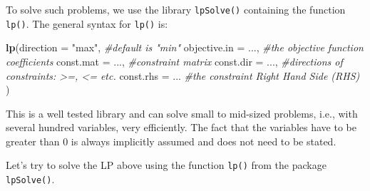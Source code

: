 \documentclass[11pt,]{article}
\newenvironment{Shaded}{\begin{snugshade}}{\end{snugshade}}
\newcommand{\KeywordTok}[1]{\textcolor[rgb]{0.13,0.29,0.53}{\textbf{#1}}}
\newcommand{\DataTypeTok}[1]{\textcolor[rgb]{0.13,0.29,0.53}{#1}}
\newcommand{\DecValTok}[1]{\textcolor[rgb]{0.00,0.00,0.81}{#1}}
\newcommand{\FloatTok}[1]{\textcolor[rgb]{0.00,0.00,0.81}{#1}}
\newcommand{\StringTok}[1]{\textcolor[rgb]{0.31,0.60,0.02}{#1}}
\newcommand{\CommentTok}[1]{\textcolor[rgb]{0.56,0.35,0.01}{\textit{#1}}}
\newcommand{\OperatorTok}[1]{\textcolor[rgb]{0.81,0.36,0.00}{\textbf{#1}}}
\newcommand{\NormalTok}[1]{#1}
\begin{document}
To solve such problems, we use the library \texttt{lpSolve()} containing
the function \texttt{lp()}. The general syntax for \texttt{lp()} is:

\begin{Shaded}
\begin{Highlighting}[]
\KeywordTok{lp}\NormalTok{(}\DataTypeTok{direction =} \StringTok{"max"}\NormalTok{, }\CommentTok{#default is "min"}
   \DataTypeTok{objective.in =}\NormalTok{ ..., }\CommentTok{#the objective function coefficients}
   \DataTypeTok{const.mat =}\NormalTok{ ..., }\CommentTok{#constraint matrix }
   \DataTypeTok{const.dir =}\NormalTok{ ..., }\CommentTok{#directions of constraints: >=, <= etc.}
   \DataTypeTok{const.rhs =}\NormalTok{ ...  }\CommentTok{#the constraint Right Hand Side (RHS)}
\NormalTok{   ) }
\end{Highlighting}
\end{Shaded}

This is a well tested library and can solve small to mid-sized problems,
i.e., with several hundred variables, very efficiently. The fact that
the variables have to be greater than 0 is always implicitly assumed and
does not need to be stated.

Let's try to solve the LP above using the function \texttt{lp()} from
the package \texttt{lpSolve()}.

\begin{Shaded}
\end{Shaded}
\end{document}
